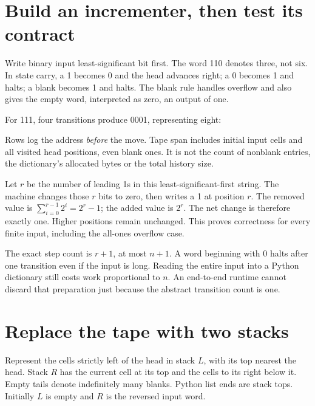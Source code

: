 \section{Build an incrementer, then test its contract}
Write binary input least-significant bit first. The word 110 denotes three,
not six. In state carry, a 1 becomes 0 and the head advances right; a 0
becomes 1 and halts; a blank becomes 1 and halts. The blank rule handles
overflow and also gives the empty word, interpreted as zero, an output of one.


For 111, four transitions produce 0001, representing eight:
\begin{center}\end{center}
Rows log the address \emph{before} the move. Tape span includes initial input
cells and all visited head positions, even blank ones. It is not the count of
nonblank entries, the dictionary's allocated bytes or the total history size.

Let $r$ be the number of leading 1s in this least-significant-first string.
The machine changes those $r$ bits to zero, then writes a 1 at position $r$.
The removed value is $\sum_{i=0}^{r-1}2^i=2^r-1$; the added value is
$2^r$. The net change is therefore exactly one. Higher positions remain
unchanged. This proves correctness for every finite input, including the
all-ones overflow case.


The exact step count is $r+1$, at most $n+1$. A word beginning with 0
halts after one transition even if the input is long. Reading the entire
input into a Python dictionary still costs work proportional to $n$.
An end-to-end runtime cannot discard that preparation just because the
abstract transition count is one.

\section{Replace the tape with two stacks}
Represent the cells strictly left of the head in stack $L$, with its top
nearest the head. Stack $R$ has the current cell at its top and the cells
to its right below it. Empty tails denote indefinitely many blanks. Python
list ends are stack tops. Initially $L$ is empty and $R$ is the reversed
input word.

